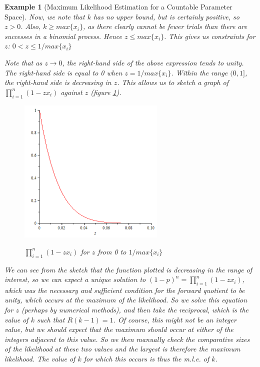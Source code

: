 \documentclass[12pt,a4paper]{article}
\newtheorem{ex}[thm]{Example}
\begin{document}
\begin{ex}[Maximum Likelihood Estimation for a Countable Parameter Space]
Now, we note that $k$ has no upper bound, but is certainly positive, so $z>0$. Also, $k \geq max\{x_i\}$, as there clearly cannot be fewer trials than there are successes in a binomial process. Hence $z \leq max\{x_i\}$. This gives us constraints for $z$: $0<z\leq 1/max\{x_i\}$

Note that as $z \rightarrow 0$, the right-hand side of the above expression tends to unity. The right-hand side is equal to 0 when $z = 1/max\{x_i\}$. Within the range $(0,1]$, the right-hand side is decreasing in $z$. This allows us to sketch a graph of $\prod_{i=1}^n (1-zx_i)$ against $z$ (figure \ref{figure discrete MLE}).

\begin{figure}[h]
\begin{center}
\includegraphics[height=7cm,width=7cm]{M2S1 Discrete MLE.png}\label{figure discrete MLE}
\caption{$\prod\limits_{i=1}^n (1-zx_i)$ for $z$ from 0 to $1/max\{x_i\}$}
\end{center}
\end{figure}

We can see from the sketch that the function plotted is decreasing in the range of interest, so we can expect a unique solution to $(1-p)^n = \prod_{i=1}^n (1-zx_i)$, which was the necessary and sufficient condition for the forward quotient to be unity, which occurs at the maximum of the likelihood. So we solve this equation for $z$ (perhaps by numerical methods), and then take the reciprocal, which is the value of $k$ such that $R(k-1) = 1$. Of course, this might not be an integer value, but we should expect that the maximum should occur at either of the integers adjacent to this value. So we then manually check the comparative sizes of the likelihood at these two values and the largest is therefore the maximum likelihood. The value of $k$ for which this occurs is thus the m.l.e. of $k$.

\end{ex}
\end{document}
